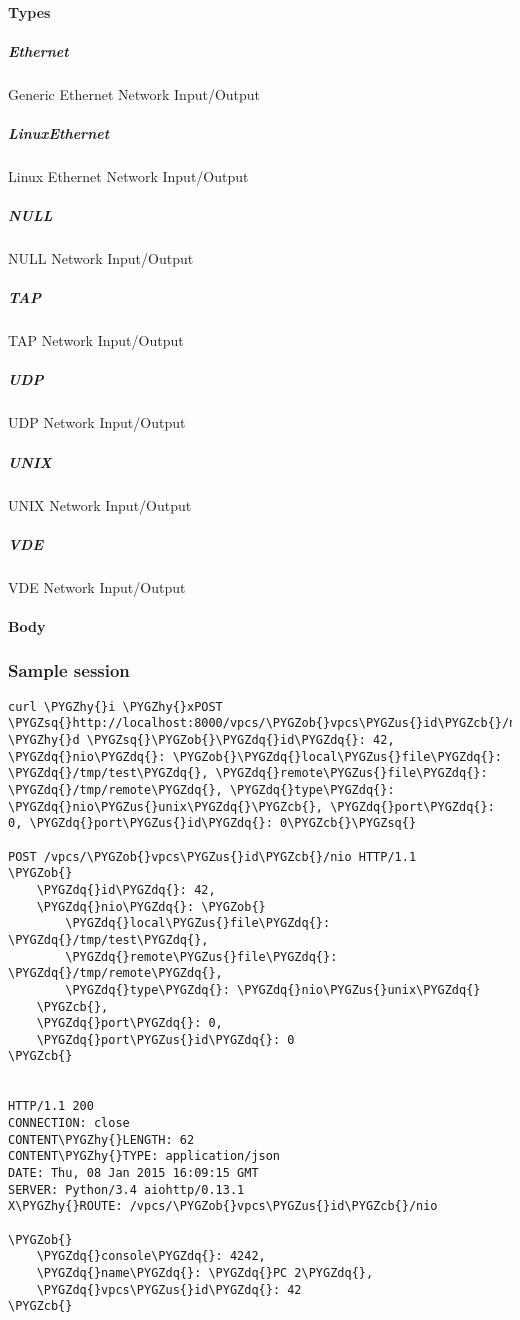 \documentclass[letterpaper,10pt,english]{sphinxmanual}
\def\PYGZus{\char`\_}
\def\PYGZob{\char`\{}
\def\PYGZcb{\char`\}}
\def\PYGZhy{\char`\-}
\def\PYGZsq{\char`\'}
\def\PYGZdq{\char`\"}
\renewcommand\PYGZsq{\textquotesingle}
\begin{document}
\paragraph{Types}
\label{api/vpcsvpcsidnio:types}

\subparagraph{Ethernet}
\label{api/vpcsvpcsidnio:ethernet}
Generic Ethernet Network Input/Output


\subparagraph{LinuxEthernet}
\label{api/vpcsvpcsidnio:linuxethernet}
Linux Ethernet Network Input/Output


\subparagraph{NULL}
\label{api/vpcsvpcsidnio:null}
NULL Network Input/Output


\subparagraph{TAP}
\label{api/vpcsvpcsidnio:tap}
TAP Network Input/Output


\subparagraph{UDP}
\label{api/vpcsvpcsidnio:udp}
UDP Network Input/Output


\subparagraph{UNIX}
\label{api/vpcsvpcsidnio:unix}
UNIX Network Input/Output


\subparagraph{VDE}
\label{api/vpcsvpcsidnio:vde}
VDE Network Input/Output


\paragraph{Body}
\label{api/vpcsvpcsidnio:body}

\subsubsection{Sample session}
\label{api/vpcsvpcsidnio:sample-session}
\begin{Verbatim}[commandchars=\\\{\}]
curl \PYGZhy{}i \PYGZhy{}xPOST \PYGZsq{}http://localhost:8000/vpcs/\PYGZob{}vpcs\PYGZus{}id\PYGZcb{}/nio\PYGZsq{} \PYGZhy{}d \PYGZsq{}\PYGZob{}\PYGZdq{}id\PYGZdq{}: 42, \PYGZdq{}nio\PYGZdq{}: \PYGZob{}\PYGZdq{}local\PYGZus{}file\PYGZdq{}: \PYGZdq{}/tmp/test\PYGZdq{}, \PYGZdq{}remote\PYGZus{}file\PYGZdq{}: \PYGZdq{}/tmp/remote\PYGZdq{}, \PYGZdq{}type\PYGZdq{}: \PYGZdq{}nio\PYGZus{}unix\PYGZdq{}\PYGZcb{}, \PYGZdq{}port\PYGZdq{}: 0, \PYGZdq{}port\PYGZus{}id\PYGZdq{}: 0\PYGZcb{}\PYGZsq{}

POST /vpcs/\PYGZob{}vpcs\PYGZus{}id\PYGZcb{}/nio HTTP/1.1
\PYGZob{}
    \PYGZdq{}id\PYGZdq{}: 42,
    \PYGZdq{}nio\PYGZdq{}: \PYGZob{}
        \PYGZdq{}local\PYGZus{}file\PYGZdq{}: \PYGZdq{}/tmp/test\PYGZdq{},
        \PYGZdq{}remote\PYGZus{}file\PYGZdq{}: \PYGZdq{}/tmp/remote\PYGZdq{},
        \PYGZdq{}type\PYGZdq{}: \PYGZdq{}nio\PYGZus{}unix\PYGZdq{}
    \PYGZcb{},
    \PYGZdq{}port\PYGZdq{}: 0,
    \PYGZdq{}port\PYGZus{}id\PYGZdq{}: 0
\PYGZcb{}


HTTP/1.1 200
CONNECTION: close
CONTENT\PYGZhy{}LENGTH: 62
CONTENT\PYGZhy{}TYPE: application/json
DATE: Thu, 08 Jan 2015 16:09:15 GMT
SERVER: Python/3.4 aiohttp/0.13.1
X\PYGZhy{}ROUTE: /vpcs/\PYGZob{}vpcs\PYGZus{}id\PYGZcb{}/nio

\PYGZob{}
    \PYGZdq{}console\PYGZdq{}: 4242,
    \PYGZdq{}name\PYGZdq{}: \PYGZdq{}PC 2\PYGZdq{},
    \PYGZdq{}vpcs\PYGZus{}id\PYGZdq{}: 42
\PYGZcb{}
\end{Verbatim}



\renewcommand{\indexname}{Index}
\printindex
\end{document}
